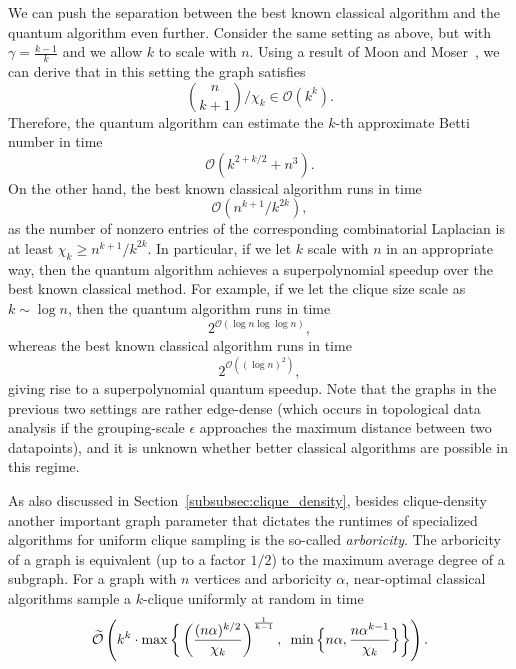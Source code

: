 \documentclass[a4paper, onecolumn, accepted=2022-08-28]{quantumarticle}
\newcommand{\bigO}[1]{\mathcal{O}\left( #1 \right)}
\newcommand{\bOt}[1]{\widetilde{\mathcal O}\left(#1\right)}
\begin{document}
We can push the separation between the best known classical algorithm and the quantum algorithm even further.
Consider the same setting as above, but with $\gamma = \frac{k-1}{k}$ and we allow $k$ to scale with $n$.
Using a result of Moon and Moser~\cite{moon:clique, lovasz:clique, ugander:clique}, we can derive that in this setting the graph satisfies
\[
\binom{n}{k+1}  / \chi_k \in \bigO{k^{k}}. 
\]
Therefore, the quantum algorithm can estimate the $k$-th approximate Betti number in time 
\[
\bigO{k^{2 + k/2} + n^3}.
\]
On the other hand, the best known classical algorithm runs in time
\[
\bigO{n^{k+1}/k^{2k}},
\]
as the number of nonzero entries of the corresponding combinatorial Laplacian is at least $\chi_k \geq n^{k+1}/k^{2k}$.
In particular, if we let $k$ scale with $n$ in an appropriate way, then the quantum algorithm achieves a superpolynomial speedup over the best known classical method.
For example, if we let the clique size scale as $k \sim \log n$, then the quantum algorithm runs in time 
\[
2^{\bigO{\log n\log \log n}},
\]
whereas the best known classical algorithm runs in time
\[
2^{\bigO{(\log n)^2}},
\]
giving rise to a superpolynomial quantum speedup. 
Note that the graphs in the previous two settings are rather edge-dense (which occurs in topological data analysis if the grouping-scale $\epsilon$ approaches the maximum distance between two datapoints), and it is unknown whether better classical algorithms are possible in this regime.

As also discussed in Section~\ref{subsubsec:clique_density}, besides clique-density another important graph parameter that dictates the runtimes of specialized algorithms for uniform clique sampling is the so-called \emph{arboricity}.
The arboricity of a graph is equivalent (up to a factor $1/2$) to the maximum average degree of a subgraph.
For a graph with $n$ vertices and arboricity $\alpha$, near-optimal classical algorithms sample a $k$-clique uniformly at random in time~\cite{eden:clique}  
\begin{align}
     \bOt{k^k \cdot \max \bigg\{\left(\frac{(n\alpha)^{k/2}}{\chi_k}\right)^{\frac{1}{k-1}}, \enskip \min\Big\{n\alpha, \frac{n\alpha^{k-1}}{\chi_k} \Big\} \bigg\} }.
     \label{eq:runtime_uniform_sampling}
\end{align}
\end{document}
